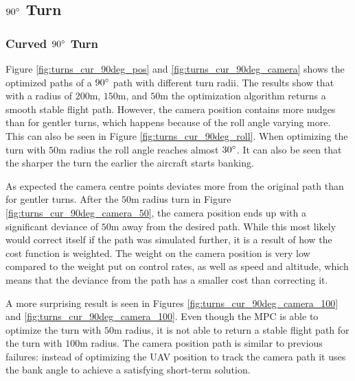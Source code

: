\subsection{$90\degree$ Turn}

\subsubsection{Curved $90\degree$ Turn}

Figure \ref{fig:turns_cur_90deg_pos} and \ref{fig:turns_cur_90deg_camera} shows the optimized paths of a $90\degree$ path with different turn radii. The results show that with a radius of $200$m, $150$m, and $50$m the optimization algorithm returns a smooth stable flight path. However, the camera position contains more nudges than for gentler turns, which happens because of the roll angle varying more. This can also be seen in Figure \ref{fig:turns_cur_90deg_roll}. When optimizing the turn with $50$m radius the roll angle reaches almost $30\degree$. It can also be seen that the sharper the turn the earlier the aircraft starts banking.

As expected the camera centre points deviates more from the original path than for gentler turns. After the $50$m radius turn in Figure \ref{fig:turns_cur_90deg_camera_50}, the camera position ends up with a significant deviance of $50$m away from the desired path. While this most likely would correct itself if the path was simulated further, it is a result of how the cost function is weighted. The weight on the camera position is very low compared to the weight put on control rates, as well as speed and altitude, which means that the deviance from the path has a smaller cost than correcting it.

A more surprising result is seen in Figures \ref{fig:turns_cur_90deg_camera_100} and \ref{fig:turns_cur_90deg_camera_100}. Even though the MPC is able to optimize the turn with $50$m radius, it is not able to return a stable flight path for the turn with $100$m radius. The camera position path is similar to previous failures: instead of optimizing the UAV position to track the camera path it uses the bank angle to achieve a satisfying short-term solution.

